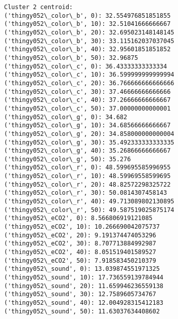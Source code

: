 \documentclass[11pt]{article}
\begin{document}
\begin{Verbatim}[commandchars=\\\{\}]
Cluster 2 centroid:
('thingy052\_color\_b', 0): 32.554976851851855
('thingy052\_color\_b', 10): 32.51041666666667
('thingy052\_color\_b', 20): 32.695023148148145
('thingy052\_color\_b', 30): 33.115162037037045
('thingy052\_color\_b', 40): 32.95601851851852
('thingy052\_color\_b', 50): 32.96875
('thingy052\_color\_c', 0): 36.43333333333334
('thingy052\_color\_c', 10): 36.599999999999994
('thingy052\_color\_c', 20): 36.766666666666666
('thingy052\_color\_c', 30): 37.46666666666666
('thingy052\_color\_c', 40): 37.26666666666667
('thingy052\_color\_c', 50): 37.00000000000001
('thingy052\_color\_g', 0): 34.682
('thingy052\_color\_g', 10): 34.68566666666667
('thingy052\_color\_g', 20): 34.858000000000004
('thingy052\_color\_g', 30): 35.492333333333335
('thingy052\_color\_g', 40): 35.26866666666667
('thingy052\_color\_g', 50): 35.276
('thingy052\_color\_r', 0): 48.599695585996955
('thingy052\_color\_r', 10): 48.59969558599695
('thingy052\_color\_r', 20): 48.82572298325722
('thingy052\_color\_r', 30): 50.0814307458143
('thingy052\_color\_r', 40): 49.713089802130895
('thingy052\_color\_r', 50): 49.587519025875174
('thingy052\_eCO2', 0): 8.566806919121085
('thingy052\_eCO2', 10): 10.266690042075737
('thingy052\_eCO2', 20): 9.191374474053296
('thingy052\_eCO2', 30): 8.707713884992987
('thingy052\_eCO2', 40): 8.051519401589527
('thingy052\_eCO2', 50): 7.918583450210379
('thingy052\_sound', 0): 13.039874551971325
('thingy052\_sound', 10): 17.736559139784944
('thingy052\_sound', 20): 11.659946236559138
('thingy052\_sound', 30): 12.7589605734767
('thingy052\_sound', 40): 12.004928315412183
('thingy052\_sound', 50): 11.63037634408602


\end{Verbatim}
\end{document}
